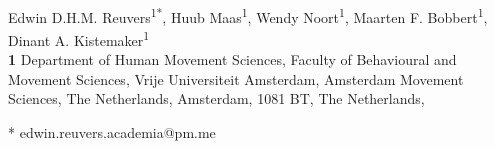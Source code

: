 \documentclass[
  10pt,
  letterpaper,
]{article}
\begin{document}
\vspace*{0.2in}

\begin{flushleft}
{\Large
\textbf{} %
}
\newline
\\
Edwin D.H.M. Reuvers\textsuperscript{1*}, Huub
Maas\textsuperscript{1}, Wendy Noort\textsuperscript{1}, Maarten F.
Bobbert\textsuperscript{1}, Dinant A. Kistemaker\textsuperscript{1}
\\
\bigskip
\textbf{1} Department of Human Movement Sciences, Faculty of Behavioural
and Movement Sciences, Vrije Universiteit Amsterdam, Amsterdam Movement
Sciences, The Netherlands, Amsterdam, 1081 BT, The Netherlands, 
\bigskip

% 
%





* edwin.reuvers.academia@pm.me

\end{flushleft}
\end{document}
